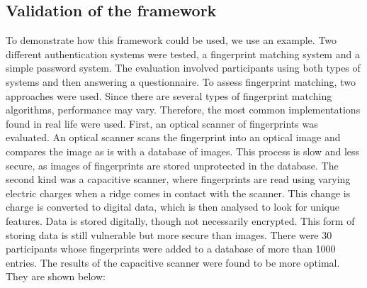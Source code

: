 \subsection{Validation of the framework}
To demonstrate how this framework could be used, we use an example. Two different authentication systems were tested, a fingerprint matching system and a simple password system. The evaluation involved participants using both types of systems and then answering a questionnaire. To assess fingerprint matching, two approaches were used. Since there are several types of fingerprint matching algorithms, performance may vary. Therefore, the most common implementations found in real life were used. First, an optical scanner of fingerprints was evaluated. An optical scanner scans the fingerprint into an optical image and compares the image as is with a database of images. This process is slow and less secure, as images of fingerprints are stored unprotected in the database. The second kind was a capacitive scanner, where fingerprints are read using varying electric charges when a ridge comes in contact with the scanner. This change is charge is converted to digital data, which is then analysed to look for unique features. Data is stored digitally, though not necessarily encrypted. This form of storing data is still vulnerable but more secure than images. There were 30 participants whose fingerprints were added to a database of more than 1000 entries. The results of the capacitive scanner were found to be more optimal. They are shown below:

\begin{center}
\begin{table}[H]
\caption{Results for Biometric systems.}
\label{tab:result1}
\end{table}
\end{center}

